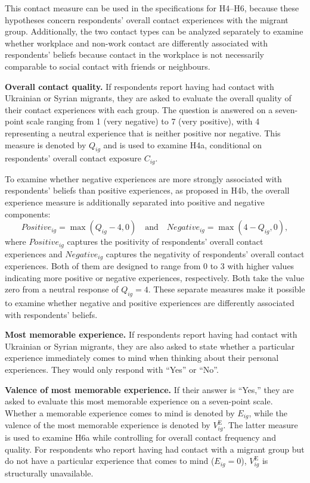 This contact measure can be used in the specifications for H4–H6, because these hypotheses concern respondents' 
overall contact experiences with the migrant group. Additionally, the two contact types can be analyzed separately 
to examine whether workplace and non-work contact are differently associated with respondents' beliefs because contact 
in the workplace is not necessarily comparable to social contact with friends or neighbours.\bigskip

\noindent\textbf{Overall contact quality.} If respondents report having had contact with Ukrainian or Syrian migrants, 
they are asked to evaluate the overall quality of their contact experiences with each group. The question is answered
on a seven-point scale ranging from 1 (very negative) to 7 (very positive), with 4 representing a neutral 
experience that is neither positive nor negative. This measure is denoted by \(Q_{ig}\) and is used to examine H4a, 
conditional on respondents' overall contact exposure \(C_{ig}\).

To examine whether negative experiences are more strongly associated with respondents' beliefs than positive experiences, 
as proposed in H4b, the overall experience measure is additionally separated into positive and negative components:
\[
Positive_{ig}=\max(Q_{ig}-4,0)
\quad \text{and} \quad
Negative_{ig}=\max(4-Q_{ig},0),
\]
where \(Positive_{ig}\) captures the positivity of respondents' overall contact experiences and 
\(Negative_{ig}\) captures the negativity of respondents' overall contact experiences. Both of them are designed to range 
from 0 to 3 with higher values indicating more positive or negative experiences, respectively. Both take the value zero
from a neutral response of \(Q_{ig}=4\). These separate measures make it possible to examine whether negative and 
positive experiences are differently associated with respondents' beliefs.\bigskip

\noindent\textbf{Most memorable experience.} If respondents report having had contact with Ukrainian or Syrian migrants,
they are also asked to state whether a particular experience immediately comes to mind when thinking about their 
personal experiences. They would only respond with ``Yes'' or ``No''.\bigskip

\noindent\textbf{Valence of most memorable experience.} If their answer is “Yes,” they are asked to evaluate this most memorable experience on a seven-point scale. 
Whether a memorable experience comes to mind is denoted by \(E_{ig}\), while the valence of the most memorable 
experience is denoted by \(V_{ig}^{\mathrm{E}}\). The latter measure is used to examine H6a while controlling for 
overall contact frequency and quality. For respondents who report having had contact with a migrant group but do 
not have a particular experience that comes to mind (\(E_{ig}=0\)), \(V_{ig}^{\mathrm{E}}\) is structurally unavailable.

